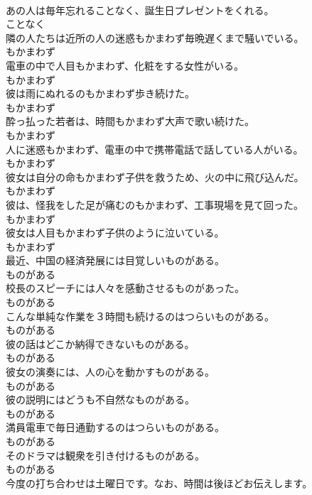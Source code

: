 \documentclass[8pt]{extreport}
\begin{document}
\begin{CJK}{UTF8}{min}
\\	あの人は毎年忘れることなく、誕生日プレゼントをくれる。	
\\	ことなく
\\	隣の人たちは近所の人の迷惑もかまわず毎晩遅くまで騒いでいる。	
\\	もかまわず
\\	電車の中で人目もかまわず、化粧をする女性がいる。	
\\	もかまわず
\\	彼は雨にぬれるのもかまわず歩き続けた。	
\\	もかまわず
\\	酔っ払った若者は、時間もかまわず大声で歌い続けた。	
\\	もかまわず
\\	人に迷惑もかまわず、電車の中で携帯電話で話している人がいる。	
\\	もかまわず
\\	彼女は自分の命もかまわず子供を救うため、火の中に飛び込んだ。	
\\	もかまわず
\\	彼は、怪我をした足が痛むのもかまわず、工事現場を見て回った。	
\\	もかまわず
\\	彼女は人目もかまわず子供のように泣いている。	
\\	もかまわず
\\	最近、中国の経済発展には目覚しいものがある。	
\\	ものがある
\\	校長のスピーチには人々を感動させるものがあった。	
\\	ものがある
\\	こんな単純な作業を３時間も続けるのはつらいものがある。	
\\	ものがある
\\	彼の話はどこか納得できないものがある。	
\\	ものがある
\\	彼女の演奏には、人の心を動かすものがある。	
\\	ものがある
\\	彼の説明にはどうも不自然なものがある。	
\\	ものがある
\\	満員電車で毎日通勤するのはつらいものがある。	
\\	ものがある
\\	そのドラマは観衆を引き付けるものがある。	
\\	ものがある
\\	今度の打ち合わせは土曜日です。なお、時間は後ほどお伝えします。	

\end{CJK}
\end{document}
